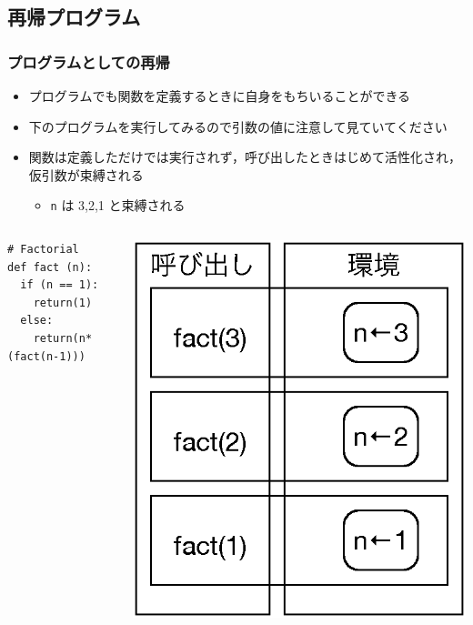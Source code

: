 \subsection{再帰プログラム}
\begin{frame}[fragile]
\frametitle{プログラムとしての再帰}
  \begin{itemize}
\item プログラムでも関数を定義するときに自身をもちいることができる
\item 下のプログラムを実行してみるので引数の値に注意して見ていてください
\item 関数は定義しただけでは実行されず，呼び出したときはじめて活性化され，仮引数が束縛される
    \begin{itemize}
\item {\tt n} は 3,2,1 と束縛される
    \end{itemize}
  \end{itemize}
  \begin{columns}[c]
    \begin{column}{0.6\textwidth}
      \begin{lstlisting}[caption={階乗 (引数表示版)},label=fact-with-puts]
# Factorial
def fact (n):
  if (n == 1):
    return(1)
  else:
    return(n*(fact(n-1)))
      \end{lstlisting}
    \end{column}
    \begin{column}{0.35\textwidth}
      \begin{center}
\includegraphics[scale=0.3]{./Figure/elementaryCS-2nd-figStack.eps}
      \end{center}
    \end{column}
  \end{columns}
\end{frame}
